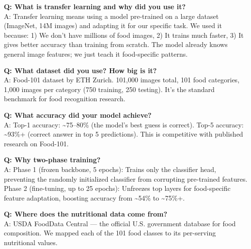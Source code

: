 \documentclass[11pt,a4paper]{article}
\begin{document}
\vspace{0.3cm}

\begin{qabox}
\textbf{Q: What is transfer learning and why did you use it?}\\[0.2cm]
A: Transfer learning means using a model pre-trained on a large dataset (ImageNet, 14M images) and adapting it for our specific task. We used it because: 1) We don't have millions of food images, 2) It trains much faster, 3) It gives better accuracy than training from scratch. The model already knows general image features; we just teach it food-specific patterns.
\end{qabox}

\vspace{0.3cm}

\begin{qabox}
\textbf{Q: What dataset did you use? How big is it?}\\[0.2cm]
A: Food-101 dataset by ETH Zurich. 101,000 images total, 101 food categories, 1,000 images per category (750 training, 250 testing). It's the standard benchmark for food recognition research.
\end{qabox}

\vspace{0.3cm}

\begin{qabox}
\textbf{Q: What accuracy did your model achieve?}\\[0.2cm]
A: Top-1 accuracy: \textasciitilde75--80\% (the model's best guess is correct). Top-5 accuracy: \textasciitilde93\%+ (correct answer in top 5 predictions). This is competitive with published research on Food-101.
\end{qabox}

\vspace{0.3cm}

\begin{qabox}
\textbf{Q: Why two-phase training?}\\[0.2cm]
A: Phase 1 (frozen backbone, 5 epochs): Trains only the classifier head, preventing the randomly initialized classifier from corrupting pre-trained features. Phase 2 (fine-tuning, up to 25 epochs): Unfreezes top layers for food-specific feature adaptation, boosting accuracy from \textasciitilde54\% to \textasciitilde75\%+.
\end{qabox}

\vspace{0.3cm}

\begin{qabox}
\textbf{Q: Where does the nutritional data come from?}\\[0.2cm]
A: USDA FoodData Central --- the official U.S. government database for food composition. We mapped each of the 101 food classes to its per-serving nutritional values.
\end{qabox}
\end{document}
